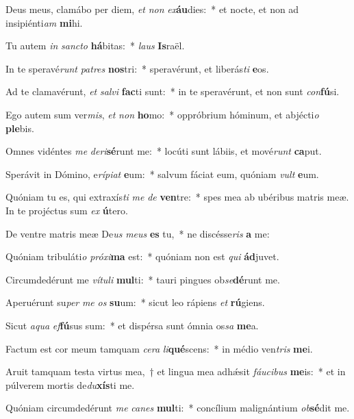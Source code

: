 \item Deus meus, clamábo per diem, \textit{et} \textit{non} \textit{ex}\textbf{áu}dies:~* et nocte, et non ad insipiénti\textit{am} \textbf{mi}hi.
\item Tu autem \textit{in} \textit{sanc}\textit{to} \textbf{há}bitas:~* \textit{laus} \textbf{Is}raël.
\item In te speravé\textit{runt} \textit{pa}\textit{tres} \textbf{nos}tri:~* speravérunt, et liberás\textit{ti} \textbf{e}os.
\item Ad te clamavérunt, \textit{et} \textit{sal}\textit{vi} \textbf{fac}ti sunt:~* in te speravérunt, et non sunt \textit{con}\textbf{fú}si.
\item Ego autem sum ver\textit{mis}, \textit{et} \textit{non} \textbf{ho}mo:~* oppróbrium hóminum, et abjécti\textit{o} \textbf{ple}bis.
\item Omnes vidéntes \textit{me} \textit{de}\textit{ri}\textbf{sé}runt me:~* locúti sunt lábiis, et mové\textit{runt} \textbf{ca}put.
\item Sperávit in Dómino, e\textit{rí}\textit{pi}\textit{at} \textbf{e}um:~* salvum fáciat eum, quóniam \textit{vult} \textbf{e}um.
\item Quóniam tu es, qui extraxís\textit{ti} \textit{me} \textit{de} \textbf{ven}tre:~* spes mea ab ubéribus matris meæ. In te projéctus sum \textit{ex} \textbf{ú}tero.
\item De ventre matris meæ De\textit{us} \textit{me}\textit{us} \textbf{es} tu,~* ne discésse\textit{ris} \textbf{a} me:
\item Quóniam tribuláti\textit{o} \textit{pró}\textit{xi}\textbf{ma} est:~* quóniam non est \textit{qui} \textbf{ád}juvet.
\item Circumdedérunt me \textit{ví}\textit{tu}\textit{li} \textbf{mul}ti:~* tauri pingues ob\textit{se}\textbf{dé}runt me.
\item Aperuérunt su\textit{per} \textit{me} \textit{os} \textbf{su}um:~* sicut leo rápiens \textit{et} \textbf{rú}giens.
\item Sicut \textit{a}\textit{qua} \textit{ef}\textbf{fú}sus sum:~* et dispérsa sunt ómnia os\textit{sa} \textbf{me}a.
\item Factum est cor meum tamquam \textit{ce}\textit{ra} \textit{li}\textbf{qué}scens:~* in médio ven\textit{tris} \textbf{me}i.
\item Aruit tamquam testa virtus mea,~† et lingua mea adhǽsit \textit{fáu}\textit{ci}\textit{bus} \textbf{me}is:~* et in púlverem mortis de\textit{du}\textbf{xís}ti me.
\item Quóniam circumdedérunt \textit{me} \textit{ca}\textit{nes} \textbf{mul}ti:~* concílium malignántium \textit{ob}\textbf{sé}dit me.
